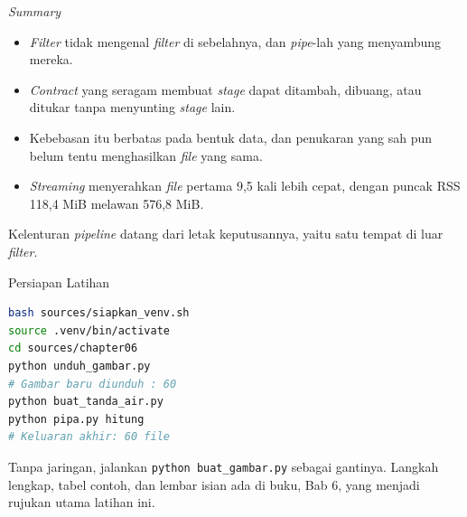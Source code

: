 \documentclass[aspectratio=169, table, 12pt]{beamer}
\begin{document}
\begin{frame}{{\Large \textit{Summary}}}
  \vspace{10pt}
  \begin{itemize}\small
    \item \textit{Filter} tidak mengenal \textit{filter} di sebelahnya, dan \textit{pipe}-lah yang
          menyambung mereka.
    \item \textit{Contract} yang seragam membuat \textit{stage} dapat ditambah,
          dibuang, atau ditukar tanpa menyunting \textit{stage} lain.
    \item Kebebasan itu berbatas pada bentuk data, dan penukaran yang sah pun
          belum tentu menghasilkan \textit{file} yang sama.
    \item \textit{Streaming} menyerahkan \textit{file} pertama 9,5 kali lebih
          cepat, dengan puncak RSS 118,4 MiB melawan 576,8 MiB.
  \end{itemize}

  \vspace{10pt}
  {\small Kelenturan \textit{pipeline} datang dari letak keputusannya, yaitu satu
  tempat di luar \textit{filter}.}
\end{frame}

\begin{frame}[fragile]{{\Large Persiapan Latihan}}
  \vspace{5pt}
\begin{lstlisting}[language=bash]
bash sources/siapkan_venv.sh
source .venv/bin/activate
cd sources/chapter06
python unduh_gambar.py
# Gambar baru diunduh : 60
python buat_tanda_air.py
python pipa.py hitung
# Keluaran akhir: 60 file
\end{lstlisting}

  \vspace{6pt}
  {\small Tanpa jaringan, jalankan \texttt{python buat\_gambar.py} sebagai
  gantinya. Langkah lengkap, tabel contoh, dan lembar isian ada di buku, Bab 6,
  yang menjadi rujukan utama latihan ini.}
\end{frame}
\end{document}
